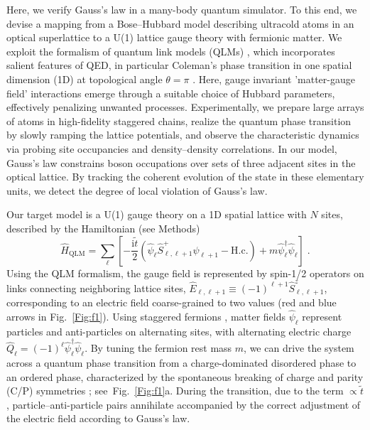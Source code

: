 \documentclass[aps,prl,twocolumn,superscriptaddress,footinbib,linenumbers]{revtex4}
\newcommand{\Fig}[1]{Fig.~\ref{#1}}
\begin{document}
Here, we verify Gauss's law in a many-body quantum simulator. To this end, we devise a mapping from a Bose--Hubbard model describing ultracold atoms in an optical superlattice to a U(1) lattice gauge theory with fermionic matter. We exploit the formalism of quantum link models (QLMs) \cite{Chandrasekharan:1997,Wiese:2013}, which incorporates salient features of QED, in particular Coleman's phase transition in one spatial dimension (1D) at topological angle $\theta=\pi$ \cite{Coleman:1976}. Here, gauge invariant 'matter-gauge field' interactions emerge through a suitable choice of Hubbard parameters, effectively penalizing unwanted processes. Experimentally, we prepare large arrays of atoms in high-fidelity staggered chains, realize the quantum phase transition by slowly ramping the lattice potentials, and observe the characteristic dynamics via probing site occupancies and density--density correlations. In our model, Gauss's law constrains boson occupations over sets of three adjacent sites in the optical lattice. By tracking the coherent evolution of the state in these elementary units, we detect the degree of local violation of Gauss's law.

Our target model is a U(1) gauge theory on a 1D spatial lattice with $N$ sites, described by the Hamiltonian (see Methods)
\begin{equation}
\label{eq:QLM_Hamiltonian}
\hat{H}_{\mathrm{QLM}} = \sum_{\ell}\left[-\frac{\textrm{i}\tilde{t}}{2}  \left( \hat{\psi}_{\ell} \hat{S}^{+}_{\ell,\ell+1} \hat{\psi}_{\ell+1} - \mathrm{H.c.}\right) + m  \hat{\psi}^{\dagger}_{\ell}\hat{\psi}_{\ell}\right] \; .
\end{equation}
Using the QLM formalism, the gauge field is represented by spin-1/2 operators on links connecting neighboring lattice sites, $\hat{E}_{\ell,\ell+1} \equiv (-1)^{\ell+1} \hat{S}^{z}_{\ell,\ell+1}$, corresponding to an electric field coarse-grained to two values (red and blue arrows in Fig.~\ref{Fig:f1}). Using staggered fermions \cite{Susskind:1977}, matter fields $\hat{\psi}_{\ell}$ represent particles and anti-particles on alternating sites, with alternating electric charge $\hat{Q}_{\ell} = (-1)^\ell\hat{\psi}^{\dagger}_{\ell}\hat{\psi}_{\ell}$. By tuning the fermion rest mass $m$, we can drive the system across a quantum phase transition from a charge-dominated disordered phase to an ordered phase, characterized by the spontaneous breaking of charge and parity (C/P) symmetries \cite{Coleman:1976,Rico:2014}; see~\Fig{Fig:f1}a.
During the transition, due to the term $\propto \tilde{t}$, particle--anti-particle pairs annihilate accompanied by the correct adjustment of the electric field according to Gauss's law.
\end{document}
